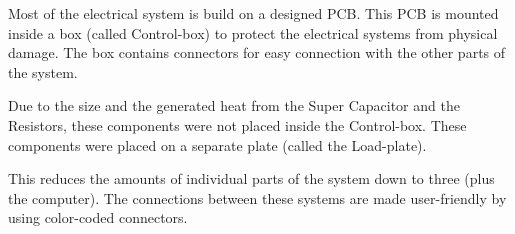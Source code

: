 Most of the electrical system is build on a designed PCB. This PCB is mounted inside a box (called Control-box) to protect the electrical systems from physical damage. The box contains connectors for easy connection with the other parts of the system.

Due to the size and the generated heat from the Super Capacitor and the Resistors, these components were not placed inside the Control-box. These components were placed on a separate plate (called the Load-plate).

This reduces the amounts of individual parts of the system down to three (plus the computer). The connections between these systems are made user-friendly by using color-coded connectors.